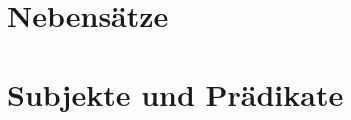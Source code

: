 \documentclass[handout,aspectratio=1610,dvipsnames]{beamer}
\begin{document}
  \section[Nebensätze]{Nebensätze}
  \let\woopsi\section\let\section\subsection\let\subsection\subsubsection
  
  \let\subsection\section\let\section\woopsi

  \section[Subjekte\slash Prädikate]{Subjekte und Prädikate}
  \let\woopsi\section\let\section\subsection\let\subsection\subsubsection
  
  \let\subsection\section\let\section\woopsi
\end{document}
